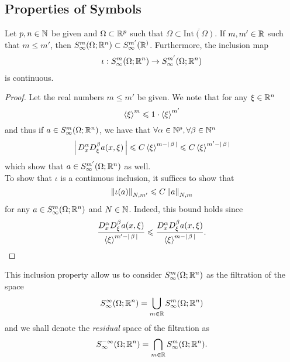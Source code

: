 \documentclass[12pt]{article}
\begin{document}
\subsection{Properties of Symbols}

\begin{fprop}
    Let $p, n \in \N$ be given and $\Omega \subset \R^p$ such that $\Omega \subset \overline{\mathrm{Int}(\Omega)}$. If $m, m' \in \R$ such that $m \leq m'$, then $S^m_\infty(\Omega; \R^n) \subset S^{m'}_\infty(\R^)$. Furthermore, the inclusion map 
    \begin{align*}
    \iota: S^m_\infty(\Omega; \R^n) \to S^{m'}_\infty(\Omega; \R^n)
    \end{align*}
    is continuous. 
\end{fprop}
\begin{proof}
    Let the real numbers $m \leq m'$ be given. We note that for any $\xi \in \R^n$
    \[
     \sym[\xi]^m \leq 1 \cdot \sym[\xi]^{m'}
     \]
    and thus if $a \in S^{m}_\infty(\Omega; \R^n)$, we have that $\forall \alpha \in \N^p, \forall \beta \in \N^n$
    \[
    \abs{D^\alpha_x D^\beta_\xi a(x, \xi)} \leq C \sym[\xi]^{m - \abs{\beta}} \leq C \sym[\xi]^{m' - \abs{\beta}} 
    \]
    which show that $a \in S^{m'}_\infty(\Omega; \R^n)$ as well. \\
    
    To show that $\iota$ is a continuous inclusion, it suffices to show that 
    \[
    \norm[\iota(a)]_{N, m'} \leq C \norm[a]_{N, m}
    \]
    for any $a \in S^{m}_\infty(\Omega; \R^n)$ and $N \in \N$. Indeed, this bound holds since 
    \[
    \frac{D^\alpha_x D^\beta_\xi a(x, \xi)}{\sym[\xi]^{m' - \abs{\beta}}}  \leq \frac{D^\alpha_x D^\beta_\xi a(x, \xi)}{\sym[\xi]^{m - \abs{\beta}}}. 
    \]
\end{proof}

This inclusion property allow us to consider $S^{m}_\infty(\Omega; \R^n)$ as the filtration of the space 
\[
S^\infty_\infty(\Omega; \R^n) = \bigcup_{m \in \R} S^{m}_\infty(\Omega; \R^n)
\]
and we shall denote the \emph{residual} space of the filtration as 
\[
S^{-\infty}_\infty(\Omega; \R^n) = \bigcap_{m \in \R} S^{m}_\infty(\Omega; \R^n). 
\]
\end{document}
